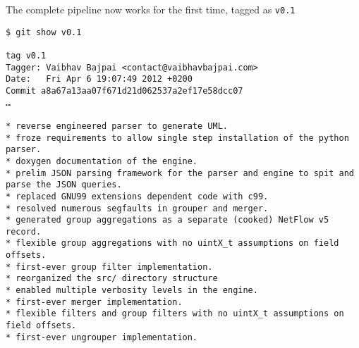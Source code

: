 The complete pipeline now works for the first time, tagged as
\lstinline!v0.1!

\begin{lstlisting}
$ git show v0.1                                                                                                              

tag v0.1        
Tagger: Vaibhav Bajpai <contact@vaibhavbajpai.com>
Date:   Fri Apr 6 19:07:49 2012 +0200   
Commit a8a67a13aa07f671d21d062537a2ef17e58dcc07
…

* reverse engineered parser to generate UML.
* froze requirements to allow single step installation of the python parser.
* doxygen documentation of the engine.
* prelim JSON parsing framework for the parser and engine to spit and parse the JSON queries.
* replaced GNU99 extensions dependent code with c99.
* resolved numerous segfaults in grouper and merger.
* generated group aggregations as a separate (cooked) NetFlow v5 record.
* flexible group aggregations with no uintX_t assumptions on field offsets.
* first-ever group filter implementation.
* reorganized the src/ directory structure
* enabled multiple verbosity levels in the engine.
* first-ever merger implementation.
* flexible filters and group filters with no uintX_t assumptions on field offsets.
* first-ever ungrouper implementation.
\end{lstlisting}

